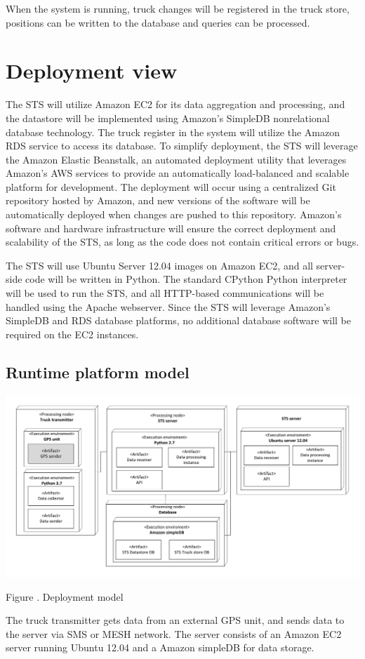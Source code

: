 \documentclass[a4paper,11pt]{report}
\newcommand{\mycaption}[1]{
  \addtocounter{figures}{1}
  Figure \arabic{figures}. #1
}
\begin{document}
When the system is running, truck changes will be registered in the truck store, positions can be written to the database and queries can be processed.

\section{Deployment view}
\label{sec:deployment-view}

The STS will utilize Amazon EC2 for its data aggregation and processing, and
the datastore will be implemented using Amazon's SimpleDB nonrelational
database technology. The truck register in the system will utilize the Amazon
RDS service to access its database. To simplify deployment, the STS will
leverage the Amazon Elastic Beanstalk, an automated deployment utility that
leverages Amazon's AWS services to provide an automatically load-balanced and
scalable platform for development. The deployment will occur using a
centralized Git repository hosted by Amazon, and new versions of the software
will be automatically deployed when changes are pushed to this repository.
Amazon's software and hardware infrastructure will ensure the correct
deployment and scalability of the STS, as long as the code does not contain
critical errors or bugs.

The STS will use Ubuntu Server 12.04 images on Amazon EC2, and all server-side
code will be written in Python. The standard CPython Python interpreter will be
used to run the STS, and all HTTP-based communications will be handled using the
Apache webserver. Since the STS will leverage Amazon's SimpleDB and RDS database
platforms, no additional database software will be required on the EC2
instances.

\subsection{Runtime platform model}
\label{sec:runt-platf-model}


\begin{center}
  \includegraphics[width=\textwidth]{figures/Runtime_platform_model}\\
  \mycaption{Deployment model}
\end{center}
 The truck transmitter gets data from an external GPS unit, and sends data to the server via SMS or MESH network. The server consists of an Amazon EC2 server running Ubuntu 12.04 and a Amazon simpleDB for data storage.
\end{document}
